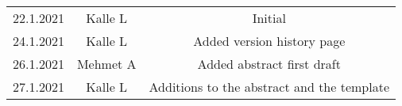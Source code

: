 \begin{center}
	\begin{tabular}{ c c c }
		22.1.2021 & Kalle L & Initial \\ 
		24.1.2021 & Kalle L & Added version history page \\
		26.1.2021 & Mehmet A & Added abstract first draft \\ 
		27.1.2021 & Kalle L & Additions to the abstract and the template \\   
	\end{tabular}
\end{center}